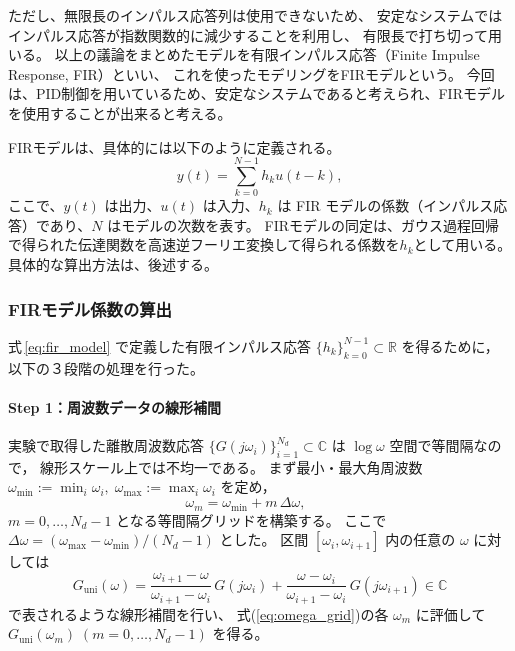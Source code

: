 ただし、無限長のインパルス応答列は使用できないため、
安定なシステムではインパルス応答が指数関数的に減少することを利用し、
有限長で打ち切って用いる。
以上の議論をまとめたモデルを有限インパルス応答（Finite Impulse Response, FIR）といい、
これを使ったモデリングをFIRモデルという。
今回は、PID制御を用いているため、安定なシステムであると考えられ、FIRモデルを使用することが出来ると考える。

FIRモデルは、具体的には以下のように定義される。
{\small
\begin{equation}
  y(t) = \sum_{k=0}^{N-1} h_k u(t-k),
  \label{eq:fir_model}
\end{equation}
}
ここで、\(y(t)\) は出力、\(u(t)\) は入力、\(h_k\) は FIR モデルの係数（インパルス応答）であり、\(N\) はモデルの次数を表す。
FIRモデルの同定は、ガウス過程回帰で得られた伝達関数を高速逆フーリエ変換して得られる係数を\(h_k\)として用いる。
具体的な算出方法は、後述する。

\subsubsection{FIRモデル係数の算出}
式\,\eqref{eq:fir_model} で定義した有限インパルス応答
\( \{h_k\}_{k=0}^{N-1}\subset\mathbb{R}\)
を得るために，以下の３段階の処理を行った。

\paragraph{Step 1：周波数データの線形補間}
実験で取得した離散周波数応答
\(
  \{G(j\omega_i)\}_{i=1}^{N_d}\subset\mathbb{C}
\)
は \(\log\omega\) 空間で等間隔なので，
線形スケール上では不均一である。 
まず最小・最大角周波数
\(
  \omega_{\min}\!:=\!\min_i\omega_i,\;
  \omega_{\max}\!:=\!\max_i\omega_i
\)
を定め，
{\small
\begin{equation}
  \label{eq:omega_grid}
  \omega_m=\omega_{\min}+m\,\Delta\omega,
  \qquad
\end{equation}
}
\(
  m=0,\dots,N_d-1
\)
となる等間隔グリッドを構築する。  
ここで
\(
  \Delta\omega=(\omega_{\max}-\omega_{\min})/(N_d-1)
\)
とした。
区間 \([\omega_i,\omega_{i+1}]\) 内の任意の
\(\omega\) に対しては
{\small
\begin{equation}
  \label{eq:linear_interpolation}
  G_{\mathrm{uni}}(\omega)
  =\frac{\omega_{i+1}-\omega}{\omega_{i+1}-\omega_i}\,
    G(j\omega_i)
  +\frac{\omega-\omega_i}{\omega_{i+1}-\omega_i}\,
    G(j\omega_{i+1})
  \in\mathbb{C}
\end{equation}
}
で表されるような線形補間を行い、
式(\ref{eq:omega_grid})の各 \(\omega_m\) に評価して
\(
  G_{\mathrm{uni}}(\omega_m)
  \;(m=0,\dots,N_d-1)
\)
を得る。

